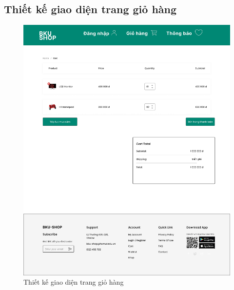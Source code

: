 \subsection {Thiết kế giao diện trang giỏ hàng}
\begin{figure}[H]
    \begin{center}
    \includegraphics[scale=0.3]{images/hieu/chap-4/cart.jpg}
    \vspace*{5mm}
    \caption{Thiết kế giao diện trang giỏ hàng}
    \end{center}
\end{figure}
